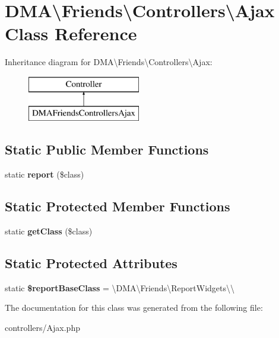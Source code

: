 \hypertarget{classDMA_1_1Friends_1_1Controllers_1_1Ajax}{}\section{D\+M\+A\textbackslash{}Friends\textbackslash{}Controllers\textbackslash{}Ajax Class Reference}
\label{classDMA_1_1Friends_1_1Controllers_1_1Ajax}
Inheritance diagram for D\+M\+A\textbackslash{}Friends\textbackslash{}Controllers\textbackslash{}Ajax\+:\begin{figure}[H]
\begin{center}
\leavevmode
\includegraphics[height=2.000000cm]{d0/d19/classDMA_1_1Friends_1_1Controllers_1_1Ajax}
\end{center}
\end{figure}
\subsection*{Static Public Member Functions}
\begin{DoxyCompactItemize}
\item 
\hypertarget{classDMA_1_1Friends_1_1Controllers_1_1Ajax_ace166e9f39d14a42d2b36bd5208ba87b}{}static {\bfseries report} (\$class)\label{classDMA_1_1Friends_1_1Controllers_1_1Ajax_ace166e9f39d14a42d2b36bd5208ba87b}

\end{DoxyCompactItemize}
\subsection*{Static Protected Member Functions}
\begin{DoxyCompactItemize}
\item 
\hypertarget{classDMA_1_1Friends_1_1Controllers_1_1Ajax_ad71c3d30735dce8ad83cecc883929855}{}static {\bfseries get\+Class} (\$class)\label{classDMA_1_1Friends_1_1Controllers_1_1Ajax_ad71c3d30735dce8ad83cecc883929855}

\end{DoxyCompactItemize}
\subsection*{Static Protected Attributes}
\begin{DoxyCompactItemize}
\item 
\hypertarget{classDMA_1_1Friends_1_1Controllers_1_1Ajax_a046649200f4c9c86cdeae78a7d801fd9}{}static {\bfseries \$report\+Base\+Class} = \textquotesingle{}\textbackslash{}D\+M\+A\textbackslash{}\+Friends\textbackslash{}\+Report\+Widgets\textbackslash{}\textbackslash{}\textquotesingle{}\label{classDMA_1_1Friends_1_1Controllers_1_1Ajax_a046649200f4c9c86cdeae78a7d801fd9}

\end{DoxyCompactItemize}


The documentation for this class was generated from the following file\+:\begin{DoxyCompactItemize}
\item 
controllers/Ajax.\+php\end{DoxyCompactItemize}
